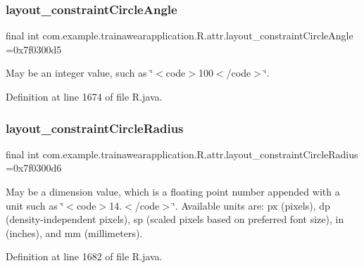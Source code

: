 \subsubsection{\texorpdfstring{layout\_constraintCircleAngle}{layout\_constraintCircleAngle}}
{\footnotesize\ttfamily final int com.\+example.\+trainawearapplication.\+R.\+attr.\+layout\+\_\+constraint\+Circle\+Angle =0x7f0300d5\hspace{0.3cm}{\ttfamily [static]}}

May be an integer value, such as \char`\"{}$<$code$>$100$<$/code$>$\char`\"{}. 

Definition at line 1674 of file R.\+java.

\mbox{\label{classcom_1_1example_1_1trainawearapplication_1_1_r_1_1attr_a20c8fa314b046feb0ab027201d05f11b}} 
\subsubsection{\texorpdfstring{layout\_constraintCircleRadius}{layout\_constraintCircleRadius}}
{\footnotesize\ttfamily final int com.\+example.\+trainawearapplication.\+R.\+attr.\+layout\+\_\+constraint\+Circle\+Radius =0x7f0300d6\hspace{0.3cm}{\ttfamily [static]}}

May be a dimension value, which is a floating point number appended with a unit such as \char`\"{}$<$code$>$14.\+5sp$<$/code$>$\char`\"{}. Available units are\+: px (pixels), dp (density-\/independent pixels), sp (scaled pixels based on preferred font size), in (inches), and mm (millimeters). 

Definition at line 1682 of file R.\+java.

\mbox{\label{classcom_1_1example_1_1trainawearapplication_1_1_r_1_1attr_ae8df2c3c86831da7a0d4dc70749edc1f}} 
